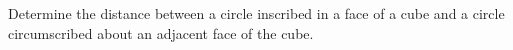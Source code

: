Determine the distance between a circle inscribed in a face of a cube
and a circle circumscribed about an adjacent face of the cube.
